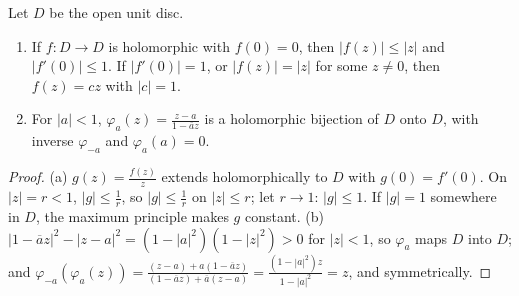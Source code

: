 \begin{lemma}\label{lem:schwarz}
Let $D$ be the open unit disc.
\begin{enumerate}
\item[(a)] If $f:D\to D$ is holomorphic with $f(0)=0$, then $|f(z)|\le|z|$ and $|f'(0)|\le1$. If $|f'(0)|=1$, or $|f(z)|=|z|$ for some $z\ne0$, then $f(z)=cz$ with $|c|=1$.
\item[(b)] For $|a|<1$, $\varphi_a(z)=\frac{z-a}{1-\overline az}$ is a holomorphic bijection of $D$ onto $D$, with inverse $\varphi_{-a}$ and $\varphi_a(a)=0$.
\end{enumerate}
\end{lemma}
\begin{proof}
(a) $g(z)=\frac{f(z)}z$ extends holomorphically to $D$ with $g(0)=f'(0)$. On $|z|=r<1$, $|g|\le\frac1r$, so $|g|\le\frac1r$ on $|z|\le r$; let $r\to1$: $|g|\le1$. If $|g|=1$ somewhere in $D$, the maximum principle
makes $g$ constant. (b) $|1-\overline az|^2-|z-a|^2=(1-|a|^2)(1-|z|^2)>0$ for $|z|<1$, so $\varphi_a$ maps $D$ into $D$; and $\varphi_{-a}(\varphi_a(z))=\frac{(z-a)+a(1-\overline az)}{(1-\overline az)+\overline a(z-a)}=\frac{(1-|a|^2)z}{1-|a|^2}=z$, and
symmetrically.
\end{proof}

